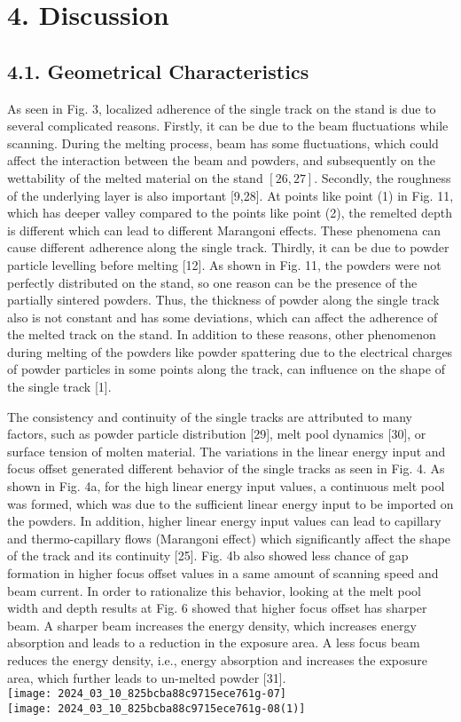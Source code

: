 \documentclass[10pt]{article}
\begin{document}
\section*{4. Discussion}
\subsection*{4.1. Geometrical Characteristics}
As seen in Fig. 3, localized adherence of the single track on the stand is due to several complicated reasons. Firstly, it can be due to the beam fluctuations while scanning. During the melting process, beam has some fluctuations, which could affect the interaction between the beam and powders, and subsequently on the wettability of the melted material on the stand $[26,27]$. Secondly, the roughness of the underlying layer is also important [9,28]. At points like point (1) in Fig. 11, which has deeper valley compared to the points like point (2), the remelted depth is different which can lead to different Marangoni effects. These phenomena can cause different adherence along the single track. Thirdly, it can be due to powder particle levelling before melting [12]. As shown in Fig. 11, the powders were not perfectly distributed on the stand, so one reason can be the presence of the partially sintered powders. Thus, the thickness of powder along the single track also is not constant and has some deviations, which can affect the adherence of the melted track on the stand. In addition to these reasons, other phenomenon during melting of the powders like powder spattering due to the electrical charges of powder particles in some points along the track, can influence on the shape of the single track [1].

The consistency and continuity of the single tracks are attributed to many factors, such as powder particle distribution [29], melt pool dynamics [30], or surface tension of molten material. The variations in the linear energy input and focus offset generated different behavior of the single tracks as seen in Fig. 4. As shown in Fig. 4a, for the high linear energy input values, a continuous melt pool was formed, which was due to the sufficient linear energy input to be imported on the powders. In addition, higher linear energy input values can lead to capillary and thermo-capillary flows (Marangoni effect) which significantly affect the shape of the track and its continuity [25]. Fig. 4b also showed less chance of gap formation in higher focus offset values in a same amount of scanning speed and beam current. In order to rationalize this behavior, looking at the melt pool width and depth results at Fig. 6 showed that higher focus offset has sharper beam. A sharper beam increases the energy density, which increases energy absorption and leads to a reduction in the exposure area. A less focus beam reduces the energy density, i.e., energy absorption and increases the exposure area, which further leads to un-melted powder [31].\\
\texttt{[image: 2024\_03\_10\_825bcba88c9715ece761g-07]}\\
\texttt{[image: 2024\_03\_10\_825bcba88c9715ece761g-08(1)]}
\end{document}
